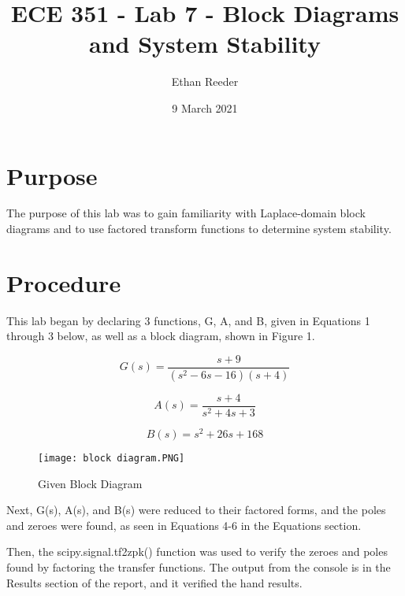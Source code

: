 \documentclass[12pt]{article}
\title{ECE 351 - Lab 7 - Block Diagrams and System Stability}
\author{Ethan Reeder}
\date{9 March 2021}
\begin{document}
\lstset{language=Python}

\maketitle

\newpage

\tableofcontents

\newpage

\section{Purpose}

The purpose of this lab was to gain familiarity with Laplace-domain block diagrams and to use factored transform functions to determine system stability.

\section{Procedure}

This lab began by declaring 3 functions, G, A, and B, given in Equations 1 through 3 below, as well as a block diagram, shown in Figure 1.

\begin{equation}
    G(s) = \frac{s+9}{(s^2-6s-16)(s+4)}
\end{equation}

\begin{equation}
    A(s) = \frac{s+4}{s^2+4s+3}
\end{equation}

\begin{equation}
    B(s) = s^2 + 26s + 168
\end{equation}

\begin{figure}[h!]
    \centering
    \texttt{[image: block diagram.PNG]}
    \caption{Given Block Diagram}
\end{figure}


Next, G(s), A(s), and B(s) were reduced to their factored forms, and the poles and zeroes were found, as seen in Equations 4-6 in the Equations section.


Then, the scipy.signal.tf2zpk() function was used to verify the zeroes and poles found by factoring the transfer functions. The output from the console is in the Results section of the report, and it verified the hand results.
\end{document}
